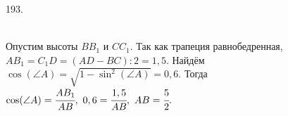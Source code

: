 193. \begin{figure}[ht!]
\end{figure}\\
Опустим высоты $BB_1$ и $CC_1.$ Так как трапеция равнобедренная, $AB_1=C_1D=(AD-BC):2=1,5.$ Найдём $\cos(\angle A)=\sqrt{1-\sin^2(\angle A)}=0,6.$ Тогда
$\cos(\angle A)=\cfrac{AB_1}{AB},\ 0,6=\cfrac{1,5}{AB},\ AB=\cfrac{5}{2}.$\\

